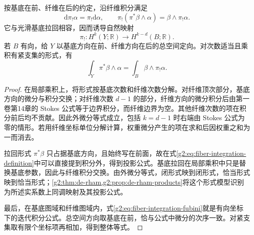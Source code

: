 \begin{theorem}\label{g2:thm:fiber-integration-forms}
	按基底在前、纤维在后的约定，沿纤维积分满足
	\begin{equation}\label{g2:eq:fiber-integration-identities}
		\mathrm d\pi_!\alpha=\pi_!\mathrm d\alpha,\qquad
		\pi_!(\pi^*\beta\wedge\alpha)=\beta\wedge\pi_!\alpha.
	\end{equation}
	它与光滑基底拉回相容，因而诱导自然映射
	\[
		\pi_!:H^k(Y;\mathbb R)\longrightarrow H^{k-d}(B;\mathbb R).
	\]
	若 \(B\) 有向，给 \(Y\) 以基底方向在前、纤维方向在后的总空间定向。对次数适当且乘积有紧支集的形式，有
	\begin{equation}\label{g2:eq:fiber-integration-fubini}
		\int_Y\pi^*\beta\wedge\alpha=\int_B\beta\wedge\pi_!\alpha.
	\end{equation}
\end{theorem}
\begin{proof}
	在局部乘积上，将形式按基底次数和纤维次数分解。对纤维顶次部分，基底方向的微分与积分交换；对纤维次数 \(d-1\) 的部分，纤维方向的微分积分后由第一卷第14章的 Stokes 公式等于边界积分，而纤维边界为空。其他纤维次数的项在积分前后均不贡献。因此外微分等式成立，包括 \(k=d-1\) 时右端由 Stokes 公式为零的情形。若用纤维坐标单位分解计算，权重微分产生的项在求和后因权重之和为一而消去。
	
	拉回形式 \(\pi^*\beta\) 只占据基底方向，且始终写在前面，故在式\eqref{g2:eq:fiber-integration-definition}中可以直接提到积分外，得到投影公式。基底拉回在局部乘积中只是替换基底参数，因此与纤维积分交换。由外微分等式，闭形式映到闭形式，恰当形式映到恰当形式；\cref{g2:thm:de-rham,g2:prop:de-rham-products}将这个形式模型识别为所述实系数上同调映射及其投影公式。
	
	最后，在基底图域和纤维图域内，式\eqref{g2:eq:fiber-integration-fubini}就是有向坐标下的迭代积分公式。总空间方向取基底在前，恰与公式中微分的次序一致。对紧支集取有限个坐标项再相加，得到整体等式。
\end{proof}

